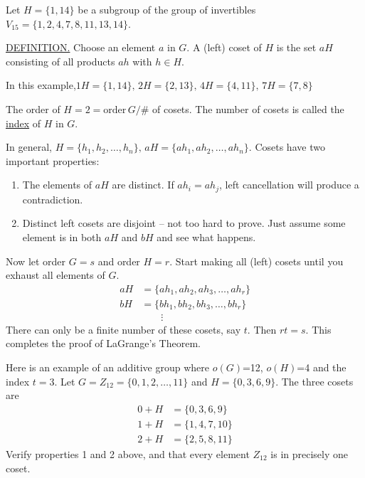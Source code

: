 \documentclass[12pt]{article}
\theoremstyle{definition}
\begin{document}
Let $H=\{1,14\}$ be a subgroup of the group of invertibles $V_{15}=\{1,2,4,7,8,11,13,14\}$.

\underline{DEFINITION.} Choose an element $a$ in $G$.  A (left) coset of $H$ is the set $aH$ consisting of all products $ah$ with $h\in H$.

In this example,$1H=\{1,14\},\,2H=\{2,13\},\,4H=\{4,11\},\,7H=\{7,8\}$

The order of $H=2=\text{order} \, G/$\# of cosets.  The number of cosets is called the \underline{index} of $H$ in $G$.

In general, $H=\{h_1, h_2, \dots, h_n\},\,aH=\{ah_1, ah_2,\dots,ah_n\}$.  Cosets have two important properties:
\begin{enumerate}
\item The elements of $aH$ are distinct.  If $ah_i=ah_j$, left cancellation will produce a contradiction.
\item Distinct left cosets are disjoint -- not too hard to prove.  Just assume some element is in both $aH$ and $bH$ and see what happens.
\end{enumerate}
Now let order $G=s$ and order $H=r$.  Start making all (left) cosets until you exhaust all elements of $G$.
\begin{equation*}\begin{split}
aH&=\{ah_1,ah_2,ah_3,\dots,ah_r\}\\
bH&=\{bh_1,bh_2,bh_3,\dots,bh_r\}\\
&\qquad\vdots
\end{split}\end{equation*}
There can only be a finite number of these cosets, say $t$.  Then $rt=s$.  This completes the proof of LaGrange's Theorem.

Here is an example of an additive group where $o(G)$=12, $o(H)$=4 and the index $t=3$.  Let $G=Z_{12}=\{0,1,2,\dots,11\}$ and $H=\{0,3,6,9\}$.  The three cosets are
\begin{equation*}\begin{split}
0+H &= \{0,3,6,9\}\\
1+H&=\{1,4,7,10\}\\
2+H&=\{2,5,8,11\}
\end{split}\end{equation*}
Verify properties 1 and 2 above, and that every element $Z_{12}$ is in precisely one coset.
\end{document}
